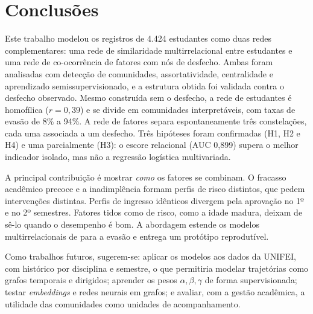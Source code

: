 \section{Conclusões}
\label{conclusoes}

Este trabalho modelou os registros de 4.424 estudantes como duas redes complementares: uma rede de similaridade multirrelacional entre estudantes e uma rede de co-ocorrência de fatores com nós de desfecho. Ambas foram analisadas com detecção de comunidades, assortatividade, centralidade e aprendizado semissupervisionado, e a estrutura obtida foi validada contra o desfecho observado. Mesmo construída sem o desfecho, a rede de estudantes é homofílica ($r=0{,}39$) e se divide em comunidades interpretáveis, com taxas de evasão de 8\% a 94\%. A rede de fatores separa espontaneamente três constelações, cada uma associada a um desfecho. Três hipóteses foram confirmadas (H1, H2 e H4) e uma parcialmente (H3): o escore relacional (AUC 0{,}899) supera o melhor indicador isolado, mas não a regressão logística multivariada.

A principal contribuição é mostrar \textit{como} os fatores se combinam. O fracasso acadêmico precoce e a inadimplência formam perfis de risco distintos, que pedem intervenções distintas. Perfis de ingresso idênticos divergem pela aprovação no 1º e no 2º semestres. Fatores tidos como de risco, como a idade madura, deixam de sê-lo quando o desempenho é bom. A abordagem estende os modelos multirrelacionais de \citet{porto2025} para a evasão e entrega um protótipo reprodutível.

Como trabalhos futuros, sugerem-se: aplicar os modelos aos dados da UNIFEI, com histórico por disciplina e semestre, o que permitiria modelar trajetórias como grafos temporais e dirigidos; aprender os pesos $\alpha,\beta,\gamma$ de forma supervisionada; testar \textit{embeddings} e redes neurais em grafos; e avaliar, com a gestão acadêmica, a utilidade das comunidades como unidades de acompanhamento.
